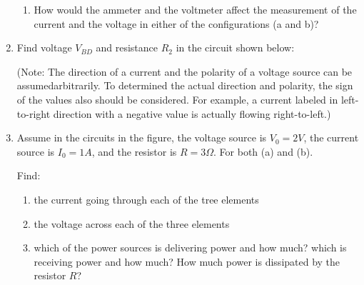 \begin{enumerate}
\begin{enumerate}
\item How would the ammeter and the voltmeter affect the measurement of the
	current and the voltage in either of the configurations (a and b)?
\end{enumerate}


\item Find voltage $V_{BD}$ and resistance $R_2$ in the circuit shown below:


(Note: The direction of a current and the polarity of a voltage source can
be assumedarbitrarily. To determined the actual direction and polarity, the
sign of the values also should be considered. For example, a current labeled 
in left-to-right direction with a negative value is actually flowing 
right-to-left.)


\item Assume in the circuits in the figure, the voltage source is $V_0=2V$,
	the current source is $I_0=1A$, and the resistor is $R=3\Omega$.
	For both (a) and (b).


Find:
\begin{enumerate}
\item the current going through each of the tree elements


\item the voltage across each of the three elements


\item which of the power sources is delivering power and how much? which is 
	receiving power and how much? How much power is dissipated by the
	resistor $R$?


\end{enumerate}
\end{enumerate}
